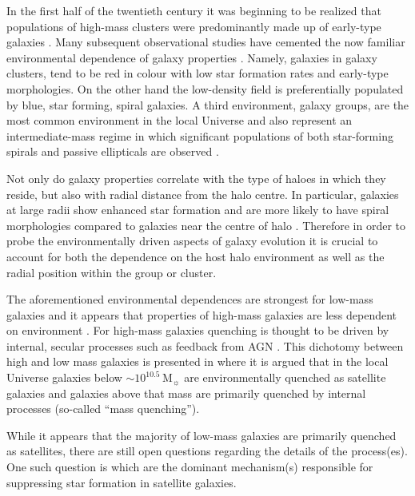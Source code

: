 \documentclass[a4paper,fleqn,usenatbib]{mnras}
\newcommand{\Msun}{\,\mathrm{M_{\sun}}}
\begin{document}
In the first half of the twentieth century it was beginning to be
realized that populations of high-mass clusters were predominantly
made up of early-type galaxies \citep{hubble1931}.  Many subsequent
observational studies have cemented the now
familiar environmental dependence of galaxy properties
\citep[e.g.][]{butcher1978, dressler1980, postman1984, dressler1999,
  blanton2005, wetzel2012}.  Namely, galaxies in galaxy clusters, tend
to be red in colour with low star formation
rates and early-type morphologies.  On the other hand the
low-density field is preferentially populated by blue, star
forming, spiral galaxies.  A third environment, galaxy groups, are the
most common environment in
the local Universe \citep{geller1983, eke2005} and also represent an
intermediate-mass regime in which significant populations of both
star-forming spirals and passive ellipticals are observed
\citep[e.g.][]{wilman2005, mcgee2011}.
\par
Not only do galaxy properties correlate with the type of haloes in
which they reside, but also with radial distance from the halo centre.
In particular, galaxies at large radii show enhanced star
formation and are more likely to have spiral morphologies compared to
galaxies near the centre of halo \citep{whitmore1993, goto2003,
  postman2005, rasmussen2012, wetzel2012, fasano2015, haines2015}.  Therefore in
order to probe the environmentally driven aspects of galaxy evolution it is
crucial to account for both the dependence on the host halo environment as
well as the radial position within the group or cluster.
\par
The aforementioned environmental dependences are strongest for
low-mass galaxies and it appears that properties of high-mass galaxies
are less dependent on environment \citep{haines2006, bamford2009}.  For
high-mass galaxies quenching is thought to be driven by internal, secular
processes such as feedback from AGN \citep[e.g.][]{schawinski2009}.  This
dichotomy between high and low mass galaxies is 
presented in \citet{peng2010} where it is argued that in
the local Universe galaxies below $\sim 10^{10.5}\Msun$ are
environmentally quenched as satellite galaxies and galaxies above that
mass are primarily quenched by internal processes (so-called ``mass
quenching'').
\par
While it appears that the majority of low-mass galaxies are primarily quenched
as satellites, there are still open questions regarding the details of
the process(es).  One such question is which are the dominant mechanism(s)
responsible for suppressing star formation in satellite galaxies.
\end{document}
